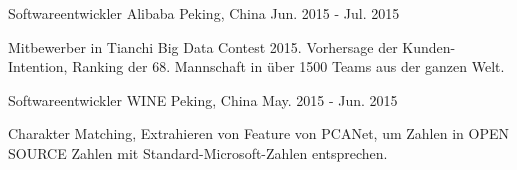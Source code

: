 \begin{cventries}

\cventry
{Softwareentwickler} %
{Alibaba} %
{Peking, China} %
{Jun. 2015 - Jul. 2015} %
{ %
\begin{cvitems}
\item {Mitbewerber in Tianchi Big Data Contest 2015. Vorhersage der Kunden-Intention, Ranking der 68. Mannschaft in über 1500 Teams aus der ganzen Welt.}
\end{cvitems}
}


\cventry
{Softwareentwickler} %
{WINE} %
{Peking, China} %
{May. 2015 - Jun. 2015} %
{ %
\begin{cvitems}
\item {Charakter Matching, Extrahieren von Feature von PCANet, um Zahlen in OPEN SOURCE Zahlen mit Standard-Microsoft-Zahlen entsprechen.}
\end{cvitems}
}


\end{cventries}
